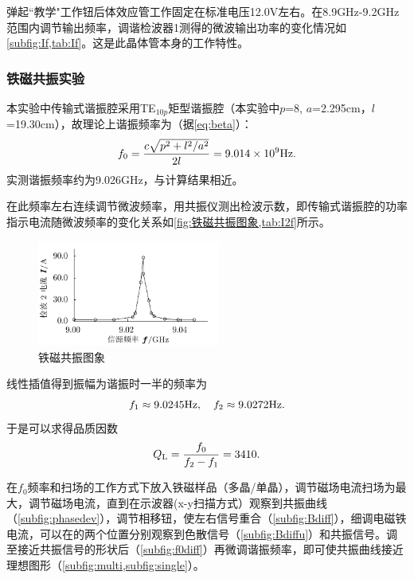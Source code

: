 	
	
	
	\par 弹起“教学"工作钮后体效应管工作固定在标准电压12.0V左右。在8.9GHz-9.2GHz范围内调节输出频率，调谐检波器1测得的微波输出功率的变化情况如\cref{subfig:If,tab:If}。这是此晶体管本身的工作特性。
\subsubsection{铁磁共振实验} %
	\label{ssub:铁磁共振实验}
	\par 本实验中传输式谐振腔采用TE$_{10p}$矩型谐振腔（本实验中$p$=8, $a$=2.295cm，$l$=19.30cm），故理论上谐振频率为（据\cref{eq:beta}）：
	\begin{equation}
		f_0=\dfrac{c\sqrt{p^2+l^2/a^2}}{2l}=9.014\times 10^9{\rm Hz}.
	\end{equation}
	实测谐振频率约为9.026GHz，与计算结果相近。
	\par 在此频率左右连续调节微波频率，用共振仪测出检波示数，即传输式谐振腔的功率指示电流随微波频率的变化关系如\cref{fig:铁磁共振图象,tab:I2f}所示。
	
	\FloatBarrier
	\begin{figure}
		\includegraphics[width=6cm]{dat/prc/I2f.pdf}\caption{铁磁共振图象\label{fig:铁磁共振图象}}
	\end{figure}
	\FloatBarrier
	\par 线性插值得到振幅为谐振时一半的频率为
	\begin{equation}
		f_1\approx 9.0245{\rm Hz},\quad f_2\approx 9.0272{\rm Hz}.
	\end{equation}
	于是可以求得品质因数
	\begin{equation}
		Q_{\rm L}=\dfrac{f_0}{f_2-f_1}=3410.
	\end{equation}
	\par 在$f_0$频率和扫场的工作方式下放入铁磁样品（多晶/单晶），调节磁场电流扫场为最大，调节磁场电流，直到在示波器(x-y扫描方式）观察到共振曲线（\cref{subfig:phasedev}），调节相移钮，使左右信号重合（\cref{subfig:Bdiff}），细调电磁铁电流，可以在的两个位置分别观察到色散信号（\cref{subfig:Bdiffu}）和共振信号。调至接近共振信号的形状后（\cref{subfig:f0diff}）再微调谐振频率，即可使共振曲线接近理想图形（\cref{subfig:multi,subfig:single}）。
